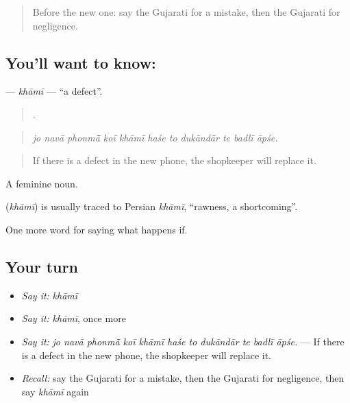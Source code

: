 \label{lesson:GU-C376-khami}



\begin{quote}
Before the new one: say the Gujarati for a mistake, then the Gujarati for negligence.
\end{quote}

\subsection*{You'll want to know: }
\textbf{} — \emph{khāmī} — \textquotedblleft{}a defect\textquotedblright{}.

\begin{quote}
          .
\end{quote}

\begin{quote}
\emph{jo navā phonmā̃ koī khāmī haśe to dukāndār te badlī āpśe.}
\end{quote}

\begin{quote}
If there is a defect in the new phone, the shopkeeper will replace it.
\end{quote}

A feminine noun.

\begin{cousinweb}
\textbf{} (\emph{khāmī}) is usually traced to Persian \emph{khāmī}, \textquotedblleft{}rawness, a shortcoming\textquotedblright{}.
\end{cousinweb}

\begin{grammarlens}[title={What you've built}]
One more word for saying what happens if.
\end{grammarlens}

\subsection*{Your turn}
\begin{itemize}
\raggedright
  \item \emph{Say it:} \emph{khāmī}
  \item \emph{Say it:} \emph{khāmī}, once more
  \item \emph{Say it:} \emph{jo navā phonmā̃ koī khāmī haśe to dukāndār te badlī āpśe.} — If there is a defect in the new phone, the shopkeeper will replace it.
  \item \emph{Recall:} say the Gujarati for a mistake, then the Gujarati for negligence, then say \emph{khāmī} again
\end{itemize}


